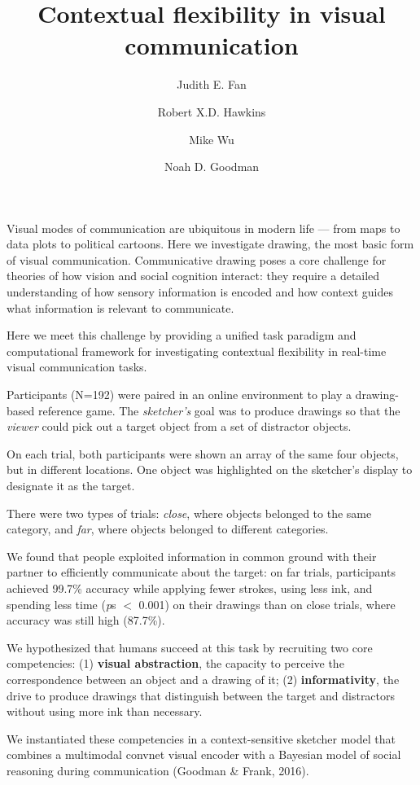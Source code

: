 \documentclass{article}
\title{Contextual flexibility in visual communication}
\author[a]{Judith E. Fan}
\author[a]{Robert X.D. Hawkins}
\author[b]{Mike Wu}
\author[a,b]{Noah D. Goodman}
\affil[a]{Department of Psychology, Stanford University}
\affil[b]{Department of Computer Science, Stanford University}
\begin{document}
\maketitle

Visual modes of communication are ubiquitous in modern life --- from maps to data plots to political cartoons. Here we investigate drawing, the most basic form of visual communication. Communicative drawing poses a core challenge for theories of how vision and social cognition interact: they require a detailed understanding of how sensory information is encoded and how context guides what information is relevant to communicate. 

Here we meet this challenge by providing a unified task paradigm and computational framework for investigating contextual flexibility in real-time visual communication tasks.

Participants (N=192) were paired in an online environment to play a drawing-based reference game. The \textit{sketcher's} goal was to produce drawings so that the \textit{viewer} could pick out a target object from a set of distractor objects.

On each trial, both participants were shown an array of the same four objects, but in different locations. One object was highlighted on the sketcher's display to designate it as the target. 

There were two types of trials: \textit{close}, where objects belonged to the same category, and \textit{far}, where objects belonged to different categories.

We found that people exploited information in common ground with their partner to efficiently communicate about the target: on far trials, participants achieved 99.7\% accuracy while applying fewer strokes, using less ink, and spending less time (\textit{p}s $<$ 0.001) on their drawings than on close trials, where accuracy was still high (87.7\%).

We hypothesized that humans succeed at this task by recruiting two core competencies: (1) \textbf{visual abstraction}, the capacity to perceive the correspondence between an object and a drawing of it; (2) \textbf{informativity}, the drive to produce drawings that distinguish between the target and distractors without using more ink than necessary. 

We instantiated these competencies in a context-sensitive sketcher model that combines a multimodal convnet visual encoder with a Bayesian model of social reasoning during communication (Goodman \& Frank, 2016).
\end{document}
